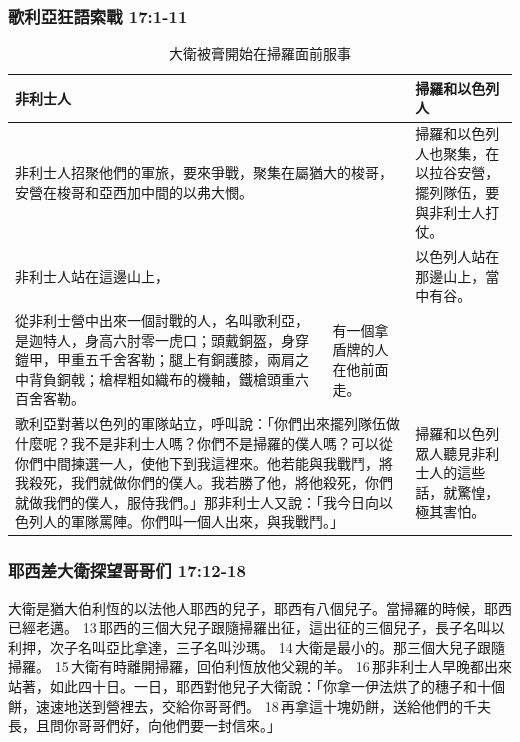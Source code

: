 \subsubsection{歌利亞狂語索戰 17:1-11}
\begin{table}[H]
\centering 
\begin{tabular}{p{9cm}|p{2cm}|p{5.5cm}}\hline\hline
\multicolumn{2}{p{11.3cm}|}{非利士人}&掃羅和以色列人\\\hline\hline
\multicolumn{2}{p{11.3cm}|}{非利士人招聚他們的軍旅，要來爭戰，聚集在屬猶大的梭哥，安營在梭哥和亞西加中間的以弗大憫。}&掃羅和以色列人也聚集，在以拉谷安營，擺列隊伍，要與非利士人打仗。\\\hline
\multicolumn{2}{p{11.3cm}|}{非利士人站在這邊山上，}&以色列人站在那邊山上，當中有谷。  \\\hline
從非利士營中出來一個討戰的人，名叫歌利亞，是迦特人，身高六肘零一虎口；頭戴銅盔，身穿鎧甲，甲重五千舍客勒；腿上有銅護膝，兩肩之中背負銅戟；槍桿粗如織布的機軸，鐵槍頭重六百舍客勒。& 有一個拿盾牌的人在他前面走。 & \\\hline
\multicolumn{2}{p{11.3cm}|}{歌利亞對著以色列的軍隊站立，呼叫說：「你們出來擺列隊伍做什麼呢？我不是非利士人嗎？你們不是掃羅的僕人嗎？可以從你們中間揀選一人，使他下到我這裡來。他若能與我戰鬥，將我殺死，我們就做你們的僕人。我若勝了他，將他殺死，你們就做我們的僕人，服侍我們。」那非利士人又說：「我今日向以色列人的軍隊罵陣。你們叫一個人出來，與我戰鬥。」}&掃羅和以色列眾人聽見非利士人的這些話，就驚惶，極其害怕。\\\hline
\end{tabular}
\caption{大衛被膏開始在掃羅面前服事}
\end{table}

\subsubsection{耶西差大衛探望哥哥们 17:12-18}
大衛是猶大伯利恆的以法他人耶西的兒子，耶西有八個兒子。當掃羅的時候，耶西已經老邁。 13 耶西的三個大兒子跟隨掃羅出征，這出征的三個兒子，長子名叫以利押，次子名叫亞比拿達，三子名叫沙瑪。 14 大衛是最小的。那三個大兒子跟隨掃羅。 15 大衛有時離開掃羅，回伯利恆放他父親的羊。 16 那非利士人早晚都出來站著，如此四十日。一日，耶西對他兒子大衛說：「你拿一伊法烘了的穗子和十個餅，速速地送到營裡去，交給你哥哥們。 18 再拿這十塊奶餅，送給他們的千夫長，且問你哥哥們好，向他們要一封信來。」

